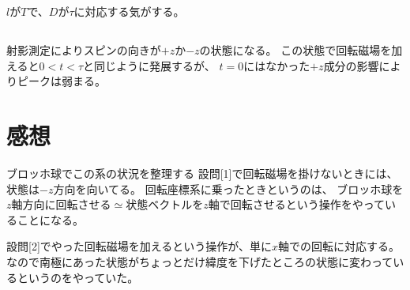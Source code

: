 \documentclass[../ap_2022.tex]{subfiles}
\begin{document}
\section{}
\subsection{}
\(l\)が\(T\)で、\(D\)が\(\tau\)に対応する気がする。

\subsection{}
射影測定によりスピンの向きが\(+z\)か\(-z\)の状態になる。
この状態で回転磁場を加えると\(0<t<\tau\)と同じように発展するが、
\(t=0\)にはなかった\(+z\)成分の影響によりピークは弱まる。

\section*{感想}
ブロッホ球でこの系の状況を整理する
設問[1]で回転磁場を掛けないときには、
状態は\(-z\)方向を向いてる。
回転座標系に乗ったときというのは、
ブロッホ球を\(z\)軸方向に回転させる\(\simeq\)状態ベクトルを\(z\)軸で回転させるという操作をやっていることになる。

設問[2]でやった回転磁場を加えるという操作が、単に\(x\)軸での回転に対応する。
なので南極にあった状態がちょっとだけ緯度を下げたところの状態に変わっているというのをやっていた。
\end{document}
